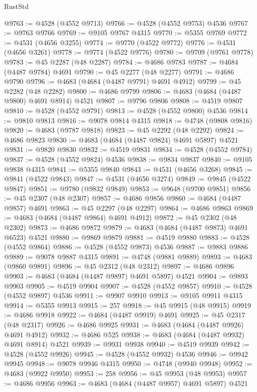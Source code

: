 \begin{lexlean}{RustStd}
\begin{coremodule}
@9763 := @4528 (@4552 @9713)
@9766 := @4528 (@4552 @9753) @4536
@9767 := @9763 @9766
@9769 := @9105 @9767 @4315
@9770 := @5355 @9769
@9772 := @4531 (@4656 @3255)
@9774 := @9770 (@4522 @9772)
@9776 := @4531 (@4656 @3261)
@9778 := @9774 (@4522 @9776)
@9780 := @9709 (@9761 @9778)
@9783 := @45 @2287 (@48 @2287)
@9784 := @4686 @9783
@9787 := @4684 (@4487 @9784) @4691
@9790 := @45 @2277 (@48 @2277)
@9791 := @4686 @9790
@9796 := @4683 (@4684 (@4487 @9791) @4691 @4912)
@9799 := @45 @2282 (@48 @2282)
@9800 := @4686 @9799
@9806 := @4683 (@4684 (@4487 @9800) @4691 @8914) @4521
@9807 := @9796 @9806
@9808 := @4519 @9807
@9810 := @4528 (@4552 @9791)
@9813 := @4528 (@4552 @9800) @4536
@9814 := @9810 @9813
@9816 := @9078 @9814 @4315
@9818 := @4748 (@9808 @9816)
@9820 := @4683 (@9787 @9818)
@9823 := @45 @2292 (@48 @2292)
@9824 := @4686 @9823
@9830 := @4683 (@4684 (@4487 @9824) @4691 @5897) @4521
@9831 := @9820 @9830
@9832 := @4519 @9831
@9834 := @4528 (@4552 @9784)
@9837 := @4528 (@4552 @9824) @4536
@9838 := @9834 @9837
@9840 := @9105 @9838 @4315
@9841 := @5355 @9840
@9843 := @4531 (@4656 @3268)
@9845 := @9841 (@4522 @9843)
@9847 := @4531 (@4656 @3274)
@9849 := @9845 (@4522 @9847)
@9851 := @9780 (@9832 @9849)
@9853 := @9648 (@9700 @9851)
@9856 := @45 @2307 (@48 @2307)
@9857 := @4686 @9856
@9860 := @4684 (@4487 @9857) @4691
@9863 := @45 @2297 (@48 @2297)
@9864 := @4686 @9863
@9869 := @4683 (@4684 (@4487 @9864) @4691 @4912)
@9872 := @45 @2302 (@48 @2302)
@9873 := @4686 @9872
@9879 := @4683 (@4684 (@4487 @9873) @4691 @6523) @4521
@9880 := @9869 @9879
@9881 := @4519 @9880
@9883 := @4528 (@4552 @9864)
@9886 := @4528 (@4552 @9873) @4536
@9887 := @9883 @9886
@9889 := @9078 @9887 @4315
@9891 := @4748 (@9881 @9889)
@9893 := @4683 (@9860 @9891)
@9896 := @45 @2312 (@48 @2312)
@9897 := @4686 @9896
@9903 := @4683 (@4684 (@4487 @9897) @4691 @5897) @4521
@9904 := @9893 @9903
@9905 := @4519 @9904
@9907 := @4528 (@4552 @9857)
@9910 := @4528 (@4552 @9897) @4536
@9911 := @9907 @9910
@9913 := @9105 @9911 @4315
@9914 := @5355 @9913
@9915 := 257
@9918 := @45 @9915 (@48 @9915)
@9919 := @4686 @9918
@9922 := @4684 (@4487 @9919) @4691
@9925 := @45 @2317 (@48 @2317)
@9926 := @4686 @9925
@9931 := @4683 (@4684 (@4487 @9926) @4691 @4912)
@9932 := @4686 @525
@9938 := @4683 (@4684 (@4487 @9932) @4691 @8914) @4521
@9939 := @9931 @9938
@9940 := @4519 @9939
@9942 := @4528 (@4552 @9926)
@9945 := @4528 (@4552 @9932) @4536
@9946 := @9942 @9945
@9948 := @9078 @9946 @4315
@9950 := @4748 (@9940 @9948)
@9952 := @4683 (@9922 @9950)
@9953 := 258
@9956 := @45 @9953 (@48 @9953)
@9957 := @4686 @9956
@9963 := @4683 (@4684 (@4487 @9957) @4691 @5897) @4521

\end{coremodule}
\end{lexlean}
